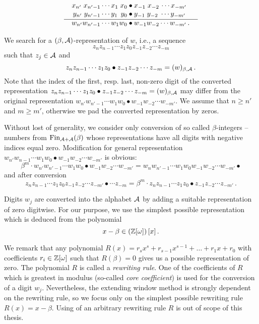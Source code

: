   \begin{align*}
  x_{n'} \;x_{{n'}-1}\cdots x_1 \;x_0 &\bullet x_{-1} \;x_{-2}\, \cdots x_{-m'} \\[-3pt]
  y_{n'} \;y_{{n'}-1}\cdots y_1 \,\;y_0 &\bullet y_{-1} \;y_{-2} \;\cdots y_{-m'} \\[-10pt]
    \line(1,0){90} & \line(1,0){100} \\[-7pt]
  w_{n'} w_{{n'}-1}\cdots w_1 w_0 &\bullet w_{-1} w_{-2} \cdots w_{-m'}\,.
  \end{align*}
  
We search for a $(\beta,\mathcal{A})$-representation of $w$, i.e., a  sequence 
  $$z_{n} z_{n-1}\cdots z_1 z_0 z_{-1} z_{-2} \cdots z_{-m}$$ such that $z_j \in \mathcal{A}$ and
  $$
    z_{n} z_{n-1}\cdots z_1 z_0 \bullet z_{-1} z_{-2} \cdots z_{-m}=(w)_{\beta,\mathcal{A}}\,.
  $$
  Note that the index of the first, resp. last, non-zero digit of the converted representation $z_{n} z_{n-1}\cdots z_1 z_0 \bullet z_{-1} z_{-2} \cdots z_{-m}=(w)_{\beta,\mathcal{A}}$ may differ from the original representation $w_{n'} w_{{n'}-1}\cdots w_1 w_0 \bullet w_{-1} w_{-2} \cdots w_{-m'}$. We assume that $ n\geq n'$ and $m\geq m'$, otherwise we pad the converted representation by zeros.
  
  Without lost of generality, we consider only conversion of so called $\beta$-integers -- numbers from $\text{Fin}_{\mathcal{A}+\mathcal{A}}(\beta)$ whose representations have all digits with negative indices equal zero. Modification for general representation $w_{n'} w_{n-1}\cdots w_1 w_0 \bullet w_{-1} w_{-2} \cdots w_{-m'}$ is obvious:
  $$
  \beta^m \cdot w_{n'} w_{n'-1}\cdots w_1 w_0 \bullet w_{-1} w_{-2} \cdots w_{-m'} = w_{n} w_{n'-1}\cdots w_1 w_0 w_{-1} w_{-2} \cdots w_{-m'} \bullet
  $$  
  and after conversion
  $$
  z_{n} z_{n-1}\cdots z_1 z_0 z_{-1} z_{-2} \cdots z_{-m'}\bullet\cdots z_{-m} = \beta^m \cdot z_{n} z_{n-1}\cdots z_1 z_0 \bullet z_{-1} z_{-2} \cdots z_{-m'}\,. 
  $$  
  
  Digits $w_j$ are converted into the alphabet $\mathcal{A}$ by adding a suitable representation of zero digitwise.
  For our purpose, we use the simplest possible representation which is deduced from the polynomial
  $$
    x-\beta \in \left(\mathbb{Z}[\omega]\right)[x]\,.
  $$

We remark that any polynomial $R(x)=r_s x^s+r_{s-1}x^{s-1}+ \dots + r_1 x+r_0$ with coefficients $r_i \in \mathbb{Z}[\omega]$ such that $R(\beta)=0$ gives us a possible representation of zero. The polynomial $R$ is called a \emph{rewriting rule}. One of the coefficients of $R$ which is greatest in modulus (so-called \emph{core coefficient}) is used for the conversion of a digit $w_j$. Nevertheless, the extending window method is strongly dependent on the rewriting rule, so we focus only on the simplest possible rewriting rule $R(x)=x-\beta$. Using of an arbitrary rewriting rule $R$ is out of scope of this thesis.

